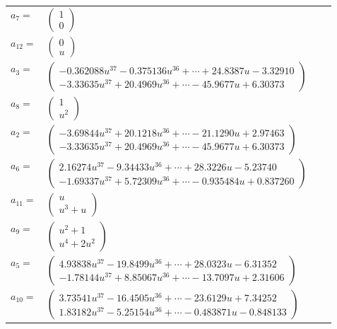 \documentclass[1p]{elsarticle_modified}
\theoremstyle{definition}
\begin{document}
\begin{tabular}{m{7pt} m{180pt} m{7pt} m{180pt} }
\flushright $a_{7}=$&$\begin{pmatrix}1\\0\end{pmatrix}$ \\
\flushright $a_{12}=$&$\begin{pmatrix}0\\u\end{pmatrix}$ \\
\flushright $a_{3}=$&$\begin{pmatrix}-0.362088 u^{37}-0.375136 u^{36}+\cdots+24.8387 u-3.32910\\-3.33635 u^{37}+20.4969 u^{36}+\cdots-45.9677 u+6.30373\end{pmatrix}$ \\
\flushright $a_{8}=$&$\begin{pmatrix}1\\u^2\end{pmatrix}$ \\
\flushright $a_{2}=$&$\begin{pmatrix}-3.69844 u^{37}+20.1218 u^{36}+\cdots-21.1290 u+2.97463\\-3.33635 u^{37}+20.4969 u^{36}+\cdots-45.9677 u+6.30373\end{pmatrix}$ \\
\flushright $a_{6}=$&$\begin{pmatrix}2.16274 u^{37}-9.34433 u^{36}+\cdots+28.3226 u-5.23740\\-1.69337 u^{37}+5.72309 u^{36}+\cdots-0.935484 u+0.837260\end{pmatrix}$ \\
\flushright $a_{11}=$&$\begin{pmatrix}u\\u^3+u\end{pmatrix}$ \\
\flushright $a_{9}=$&$\begin{pmatrix}u^2+1\\u^4+2 u^2\end{pmatrix}$ \\
\flushright $a_{5}=$&$\begin{pmatrix}4.93838 u^{37}-19.8499 u^{36}+\cdots+28.0323 u-6.31352\\-1.78144 u^{37}+8.85067 u^{36}+\cdots-13.7097 u+2.31606\end{pmatrix}$ \\
\flushright $a_{10}=$&$\begin{pmatrix}3.73541 u^{37}-16.4505 u^{36}+\cdots-23.6129 u+7.34252\\1.83182 u^{37}-5.25154 u^{36}+\cdots-0.483871 u-0.848133\end{pmatrix}$ \\

\end{tabular}
\end{document}
